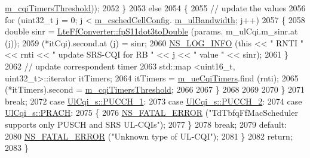 \begin{DoxyCode}
      \hyperlink{classns3_1_1TdTbfqFfMacScheduler_a4a154b47a91bb301ab183ce57e44c431}{m\_cqiTimersThreshold}));
2052           \}
2053         \textcolor{keywordflow}{else}
2054           \{
2055             \textcolor{comment}{// update the values}
2056             \textcolor{keywordflow}{for} (uint32\_t j = 0; j < \hyperlink{classns3_1_1TdTbfqFfMacScheduler_a3ac3e4b1b3818ff204d6ff6c89c19f4d}{m\_cschedCellConfig}.
      \hyperlink{structns3_1_1FfMacCschedSapProvider_1_1CschedCellConfigReqParameters_a5ab5b102878e6e7e7727a14af4a64d2f}{m\_ulBandwidth}; j++)
2057               \{
2058                 \textcolor{keywordtype}{double} sinr = \hyperlink{classns3_1_1LteFfConverter_aa5d8c2a8f988dbd63da91818c18666eb}{LteFfConverter::fpS11dot3toDouble} (params.
      m\_ulCqi.m\_sinr.at (j));
2059                 (*itCqi).second.at (j) = sinr;
2060                 \hyperlink{group__logging_gafbd73ee2cf9f26b319f49086d8e860fb}{NS\_LOG\_INFO} (\textcolor{keyword}{this} << \textcolor{stringliteral}{" RNTI "} << rnti << \textcolor{stringliteral}{" update SRS-CQI for RB  "} << j << \textcolor{stringliteral}{"
       value "} << sinr);
2061               \}
2062             \textcolor{comment}{// update correspondent timer}
2063             std::map <uint16\_t, uint32\_t>::iterator itTimers;
2064             itTimers = \hyperlink{classns3_1_1TdTbfqFfMacScheduler_abc6132bce28b1ee650503bf3144eb22a}{m\_ueCqiTimers}.find (rnti);
2065             (*itTimers).second = \hyperlink{classns3_1_1TdTbfqFfMacScheduler_a4a154b47a91bb301ab183ce57e44c431}{m\_cqiTimersThreshold};
2066 
2067           \}
2068 
2069 
2070       \}
2071       \textcolor{keywordflow}{break};
2072     \textcolor{keywordflow}{case} \hyperlink{structns3_1_1UlCqi__s_aece9e5ebea42eb9ff1744c72c8459b57a05ca6554bc6fcd96a0a51fbaa8e794c7}{UlCqi\_s::PUCCH\_1}:
2073     \textcolor{keywordflow}{case} \hyperlink{structns3_1_1UlCqi__s_aece9e5ebea42eb9ff1744c72c8459b57a35664b4bda6f1cd6acfe9edc84c7571d}{UlCqi\_s::PUCCH\_2}:
2074     \textcolor{keywordflow}{case} \hyperlink{structns3_1_1UlCqi__s_aece9e5ebea42eb9ff1744c72c8459b57af93f36792cb1eed08f6119e4abfe58e8}{UlCqi\_s::PRACH}:
2075       \{
2076         \hyperlink{group__fatal_ga5131d5e3f75d7d4cbfd706ac456fdc85}{NS\_FATAL\_ERROR} (\textcolor{stringliteral}{"TdTbfqFfMacScheduler supports only PUSCH and SRS UL-CQIs"});
2077       \}
2078       \textcolor{keywordflow}{break};
2079     \textcolor{keywordflow}{default}:
2080       \hyperlink{group__fatal_ga5131d5e3f75d7d4cbfd706ac456fdc85}{NS\_FATAL\_ERROR} (\textcolor{stringliteral}{"Unknown type of UL-CQI"});
2081     \}
2082   \textcolor{keywordflow}{return};
2083 \}
\end{DoxyCode}


